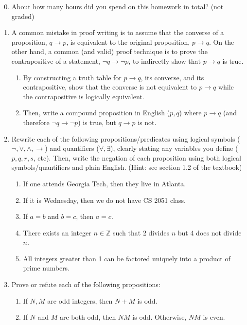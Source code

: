 \documentclass{article}
\begin{document}
\begin{enumerate}
    \setcounter{enumi}{-1}
    \item About how many hours did you spend on this homework in total? (not graded)
    \item A common mistake in proof writing is to assume that the converse of a proposition, $q \rightarrow p$, is equivalent to the original proposition, $p \rightarrow q$. On the other hand, a common (and valid) proof technique is to prove the contrapositive of a statement, $\neg q \rightarrow \neg p$, to indirectly show that $p \rightarrow q$ is true.
    \begin{enumerate}
        \item By constructing a truth table for $p \rightarrow q$, its converse, and its contrapositive, show that the converse is not equivalent to $p \rightarrow q$ while the contrapositive is logically equivalent.
        \item Then, write a compound proposition in English ($p, q$) where $p \rightarrow q$ (and therefore $\neg q \rightarrow \neg p$) is true, but $q \rightarrow p$ is not.
    \end{enumerate}
    \item Rewrite each of the following propositions/predicates using logical symbols ($\neg, \lor, \land, \rightarrow$) and quantifiers ($\forall, \exists$), clearly stating any variables you define ($p, q, r, s$, etc). Then, write the negation of each proposition using both logical symbols/quantifiers and plain English. (Hint: see section 1.2 of the textbook)
    \begin{enumerate}
        \item If one attends Georgia Tech, then they live in Atlanta.
        \item If it is Wednesday, then we do not have CS 2051 class.
        \item If $a = b$ and $b = c$, then $a = c$.
        \item There exists an integer $n \in \mathbb{Z}$ such that 2 divides $n$ but 4 does not divide $n$.
        \item All integers greater than 1 can be factored uniquely into a product of prime numbers.
    \end{enumerate}
    \item Prove or refute each of the following propositions:
    \begin{enumerate}
        \item If $N, M$ are odd integers, then $N + M$ is odd.
        \item If $N$ and $M$ are both odd, then $NM$ is odd. Otherwise, $NM$ is even.

\end{enumerate}
\end{enumerate}
\end{document}
